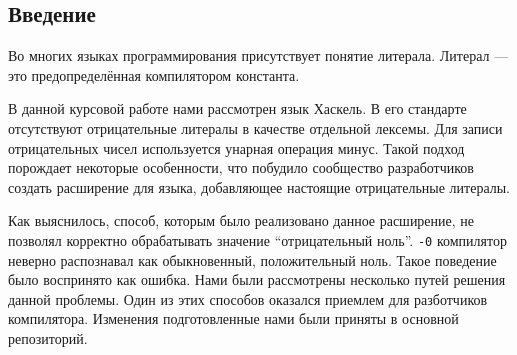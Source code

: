 \subsection*{Введение}

Во многих языках программирования присутствует понятие литерала. Литерал ---
это предопределённая компилятором константа.

В данной курсовой работе нами рассмотрен язык Хаскель. В его стандарте
\cite{haskell2010} отсутствуют отрицательные литералы в качестве отдельной
лексемы. Для записи отрицательных чисел используется унарная операция минус.
Такой подход порождает некоторые особенности, что побудило сообщество
разработчиков создать расширение для языка, добавляющее настоящие отрицательные
литералы.

Как выяснилось, способ, которым было реализовано данное расширение, не позволял
корректно обрабатывать значение ``отрицательный ноль''. \texttt{-0} компилятор
неверно распознавал как обыкновенный, положительный ноль. Такое поведение было
воспринято как ошибка. Нами были рассмотрены несколько путей решения данной
проблемы. Один из этих способов оказался приемлем для разботчиков компилятора.
Изменения подготовленные нами были приняты в основной репозиторий.
